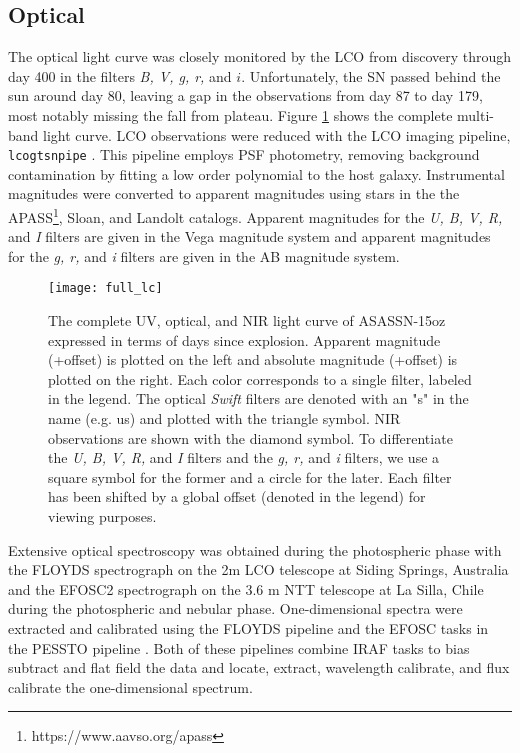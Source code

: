 \documentclass[a4paper,fleqn,usenatbib]{mnras}
\begin{document}
\subsection{Optical \label{subsec:optical}}
The optical light curve was closely monitored by the LCO from discovery through day 400 in the filters {\it B, V, g, r,} and $i$. 
Unfortunately, the SN passed behind the sun around day 80, leaving a gap in the observations from day 87 to day 179, most notably missing the fall from plateau.
Figure \ref{fig:LC} shows the complete multi-band light curve.
LCO observations were reduced with the LCO imaging pipeline, {\tt lcogtsnpipe} \citep{2016valenti}. 
This pipeline employs PSF photometry, removing background contamination by fitting a low order polynomial to the host galaxy.
Instrumental magnitudes were converted to apparent magnitudes using stars in the the APASS\footnote{https://www.aavso.org/apass}, Sloan, and Landolt catalogs.
Apparent magnitudes for the {\it U, B, V, R,} and {\it I} filters are given in the Vega magnitude system and apparent magnitudes for  the {\it g, r,} and {\it i} filters are given in the AB magnitude system.
\begin{figure}
\begin{center}
\texttt{[image: full\_lc]}
\caption{The complete UV, optical, and NIR light curve of ASASSN-15oz expressed in terms of days since explosion.
Apparent magnitude (+offset) is plotted on the left and absolute magnitude (+offset) is plotted on the right. 
Each color corresponds to a single filter, labeled in the legend. 
The optical {\it Swift} filters are denoted with an "s" in the name (e.g. us) and plotted with the triangle symbol.
NIR observations are shown with the diamond symbol.
To differentiate the {\it U, B, V, R,} and {\it I} filters and the {\it g, r,} and {\it i} filters, we use a square symbol for the former and a circle for the later.
Each filter has been shifted by a global offset (denoted in the legend) for viewing purposes.}
\label{fig:LC}
\end{center}
\end{figure}

Extensive optical spectroscopy was obtained during the photospheric phase with the FLOYDS spectrograph \citep{2013brown} on the 2m LCO telescope at Siding Springs, Australia and the EFOSC2 spectrograph \citep{1984buzzoni} on the 3.6 m NTT telescope at La Silla, Chile during the photospheric and nebular phase. 
One-dimensional spectra were extracted and calibrated using the FLOYDS pipeline \citep{2014valenti} and the EFOSC tasks in the PESSTO pipeline \citep{2015smartt}. 
Both of these pipelines combine IRAF tasks to bias subtract and flat field the data and locate, extract, wavelength calibrate, and flux calibrate the one-dimensional spectrum.
\end{document}

